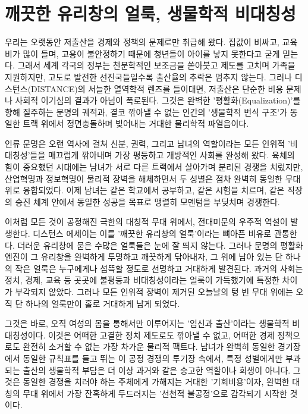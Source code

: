 

\section{깨끗한 유리창의 얼룩, 생물학적 비대칭성}
우리는 오랫동안 저출산을 경제와 정책의 문제로만 취급해 왔다. 집값이 비싸고, 교육비가 많이 들며, 고용이 불안정하기 때문에 청년들이 아이를 낳지 못한다고 굳게 믿는다. 그래서 세계 각국의 정부는 천문학적인 보조금을 쏟아붓고 제도를 고치며 가족을 지원하지만, 고도로 발전한 선진국들일수록 출산율의 추락은 멈추지 않는다.
그러나 디스턴스(DISTANCE)의 서늘한 열역학적 렌즈를 들이대면, 저출산은 단순한 비용 문제나 사회적 이기심의 결과가 아님이 폭로된다. 그것은 완벽한 '평활화(Equalization)'를 향해 질주하는 문명의 궤적과, 결코 깎아낼 수 없는 인간의 '생물학적 번식 구조'가 동일한 트랙 위에서 정면충돌하며 빚어내는 거대한 물리학적 파열음이다. 

인류 문명은 오랜 역사에 걸쳐 신분, 권력, 그리고 남녀의 역할이라는 모든 인위적 '비대칭성'들을 매끄럽게 깎아내며 가장 평등하고 개방적인 사회를 완성해 왔다. 육체의 힘이 중요했던 시대에는 남녀가 서로 다른 트랙에서 살아가며 분리된 경쟁을 치렀지만, 산업혁명과 정보혁명이 물리적 장벽을 해체하면서 두 성별은 점차 완벽히 동일한 무대 위로 융합되었다. 이제 남녀는 같은 학교에서 공부하고, 같은 시험을 치르며, 같은 직장의 승진 체계 안에서 동일한 성공을 목표로 맹렬히 모멘텀을 부딪치며 경쟁한다.

이처럼 모든 것이 공정해진 극한의 대칭적 무대 위에서, 전대미문의 우주적 역설이 발생한다. 디스턴스 에세이는 이를 '깨끗한 유리창의 얼룩'이라는 뼈아픈 비유로 관통한다. 더러운 유리창에 묻은 수많은 얼룩들은 눈에 잘 띄지 않는다. 그러나 문명의 평활화 엔진이 그 유리창을 완벽하게 투명하고 깨끗하게 닦아내자, 그 위에 남아 있는 단 하나의 작은 얼룩은 누구에게나 섬뜩할 정도로 선명하고 거대하게 발견된다. 과거의 사회는 정치, 경제, 교육 등 곳곳에 불평등과 비대칭성이라는 얼룩이 가득했기에 특정한 차이가 부각되지 않았다. 그러나 모든 인위적 장벽이 제거된 오늘날의 텅 빈 무대 위에는 오직 단 하나의 얼룩만이 홀로 거대하게 남게 되었다.

그것은 바로, 오직 여성의 몸을 통해서만 이루어지는 '임신과 출산'이라는 생물학적 비대칭성이다.
이것은 어떠한 고결한 정치 제도로도 깎아낼 수 없고, 어떠한 경제 정책으로도 완전히 소거할 수 없는 가장 차가운 물리적 팩트다. 남녀가 완벽히 동일한 경기장에서 동일한 규칙표를 들고 뛰는 이 공정 경쟁의 투기장 속에서, 특정 성별에게만 부과되는 출산의 생물학적 부담은 더 이상 과거와 같은 숭고한 역할이나 희생이 아니다. 그것은 동일한 경쟁을 치러야 하는 주체에게 가해지는 거대한 '기회비용'이자, 완벽한 대칭의 무대 위에서 가장 잔혹하게 두드러지는 '선천적 불공정'으로 감각되기 시작한 것이다.


